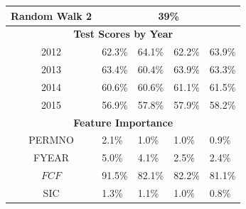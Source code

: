 {{\begin{table}[]
{\begin{tabular}{cllll}
\multicolumn{1}{|c|}{Random Walk 2}                  & \multicolumn{4}{c|}{39\%}                                                                                                                     \\ \hline
\multicolumn{5}{|c|}{\textbf{Test Scores by Year}}                                                                                                                                                   \\ \hline
\multicolumn{1}{|c|}{2012}                           & \multicolumn{1}{l|}{62.3\%}       & \multicolumn{1}{l|}{64.1\%}       & \multicolumn{1}{l|}{62.2\%}       & \multicolumn{1}{l|}{63.9\%}       \\ \hline
\multicolumn{1}{|c|}{2013}                           & \multicolumn{1}{l|}{63.4\%}       & \multicolumn{1}{l|}{60.4\%}       & \multicolumn{1}{l|}{63.9\%}       & \multicolumn{1}{l|}{63.3\%}       \\ \hline
\multicolumn{1}{|c|}{2014}                           & \multicolumn{1}{l|}{60.6\%}       & \multicolumn{1}{l|}{60.6\%}       & \multicolumn{1}{l|}{61.1\%}       & \multicolumn{1}{l|}{61.5\%}       \\ \hline
\multicolumn{1}{|c|}{2015}                           & \multicolumn{1}{l|}{56.9\%}       & \multicolumn{1}{l|}{57.8\%}       & \multicolumn{1}{l|}{57.9\%}       & \multicolumn{1}{l|}{58.2\%}       \\ \hline
\multicolumn{5}{|c|}{\textbf{Feature Importance}}                                                                                                                                                    \\ \hline
\multicolumn{1}{|c|}{PERMNO}                         & \multicolumn{1}{l|}{2.1\%}        & \multicolumn{1}{l|}{1.0\%}        & \multicolumn{1}{l|}{1.0\%}        & \multicolumn{1}{l|}{0.9\%}        \\ \hline
\multicolumn{1}{|c|}{FYEAR}                          & \multicolumn{1}{l|}{5.0\%}        & \multicolumn{1}{l|}{4.1\%}        & \multicolumn{1}{l|}{2.5\%}        & \multicolumn{1}{l|}{2.4\%}        \\ \hline
\multicolumn{1}{|c|}{$FCF$}                          & \multicolumn{1}{l|}{91.5\%}       & \multicolumn{1}{l|}{82.1\%}       & \multicolumn{1}{l|}{82.2\%}       & \multicolumn{1}{l|}{81.1\%}       \\ \hline
\multicolumn{1}{|c|}{SIC}                            & \multicolumn{1}{l|}{1.3\%}        & \multicolumn{1}{l|}{1.1\%}        & \multicolumn{1}{l|}{1.0\%}        & \multicolumn{1}{l|}{0.8\%}        \\ \hline

\end{tabular}}
\end{table}}}
